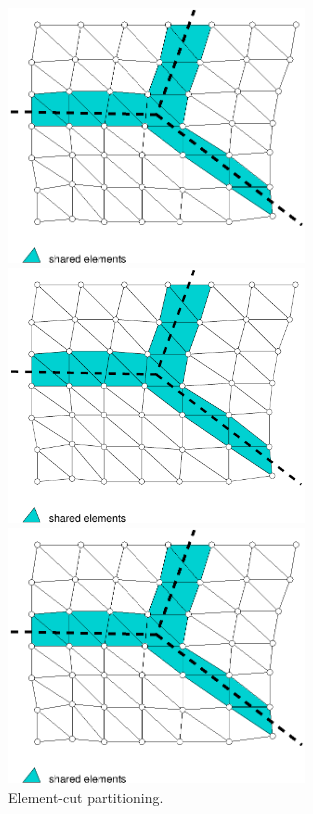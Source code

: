 \documentclass[a4paper]{article}
\begin{document}

\begin{figure}[htb]
\begin{htmlonly}
  \centerline{\includegraphics[width=0.7\textwidth]{elementcut0.eps}}
\end{htmlonly}
\ifpdf
\centerline{\includegraphics[width=0.7\textwidth]{elementcut0.pdf}}
\else
\centerline{\includegraphics[width=0.7\textwidth]{elementcut0.eps}}
\fi
\caption{Element-cut partitioning.}
\label{elmentcut}
\end{figure}
\end{document}
